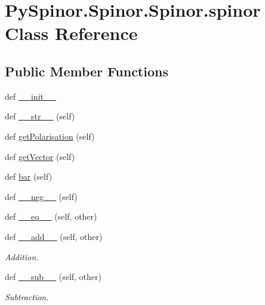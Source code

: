\hypertarget{class_py_spinor_1_1_spinor_1_1_spinor_1_1spinor}{}\section{Py\+Spinor.\+Spinor.\+Spinor.\+spinor Class Reference}
\label{class_py_spinor_1_1_spinor_1_1_spinor_1_1spinor}
\subsection*{Public Member Functions}
\begin{DoxyCompactItemize}
\item 
def \hyperlink{class_py_spinor_1_1_spinor_1_1_spinor_1_1spinor_ac0ac1a9c34ee87ffdf28d0ccb75d70f6}{\+\_\+\+\_\+init\+\_\+\+\_\+}
\item 
def \hyperlink{class_py_spinor_1_1_spinor_1_1_spinor_1_1spinor_a25b5c7b4cb11c895cd7d52299e920109}{\+\_\+\+\_\+str\+\_\+\+\_\+} (self)
\item 
def \hyperlink{class_py_spinor_1_1_spinor_1_1_spinor_1_1spinor_aa24c84582fe66fb8c3faf9ac2d154d33}{get\+Polarisation} (self)
\item 
def \hyperlink{class_py_spinor_1_1_spinor_1_1_spinor_1_1spinor_a8978e7ce7a8062bc89a49869f56f6a7d}{get\+Vector} (self)
\item 
def \hyperlink{class_py_spinor_1_1_spinor_1_1_spinor_1_1spinor_a0d17e1251c4f618d0ec774afb81faeee}{bar} (self)
\item 
def \hyperlink{class_py_spinor_1_1_spinor_1_1_spinor_1_1spinor_af465a6725d4bacc98904a549aa3f7d11}{\+\_\+\+\_\+neg\+\_\+\+\_\+} (self)
\item 
def \hyperlink{class_py_spinor_1_1_spinor_1_1_spinor_1_1spinor_a6bbf536bf21e0cf2a07e4303c73005fc}{\+\_\+\+\_\+eq\+\_\+\+\_\+} (self, other)
\item 
def \hyperlink{class_py_spinor_1_1_spinor_1_1_spinor_1_1spinor_abdb11b78abbe44edc5a142bc3bc7a9f3}{\+\_\+\+\_\+add\+\_\+\+\_\+} (self, other)
\begin{DoxyCompactList}\small\item\em Addition. \end{DoxyCompactList}\item 
def \hyperlink{class_py_spinor_1_1_spinor_1_1_spinor_1_1spinor_ab5bdcc99b407f583ccc01b3bb1a8bab1}{\+\_\+\+\_\+sub\+\_\+\+\_\+} (self, other)
\begin{DoxyCompactList}\small\item\em Subtraction. \end{DoxyCompactList}\item 

\end{DoxyCompactItemize}
